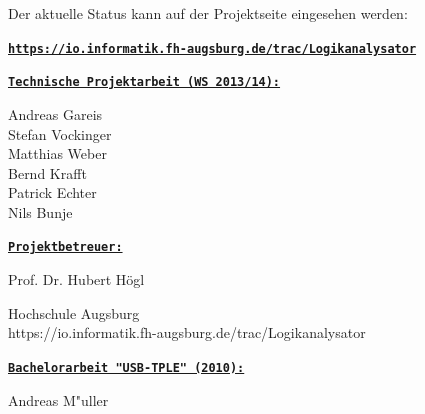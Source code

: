 \documentclass[
a4paper,
]{leaflet}
\begin{document}
Der aktuelle Status kann auf der Projektseite eingesehen werden:

\vskip 30pt

\begin{center}
{\bf \underline \tt \large https://io.informatik.fh-augsburg.de/trac/Logikanalysator}
\end{center}

\eject

\vspace*{\fill}




{\bf \underline \tt Technische Projektarbeit (WS 2013/14):}

Andreas Gareis\\Stefan Vockinger\\Matthias Weber\\Bernd Krafft\\Patrick Echter\\Nils Bunje

{\bf \underline \tt Projektbetreuer:}

Prof. Dr. Hubert H\"ogl

Hochschule Augsburg\\https://io.informatik.fh-augsburg.de/trac/Logikanalysator

{\bf \underline\tt Bachelorarbeit "{}USB-TPLE"{} (2010):}

Andreas M"uller

\end{document}
